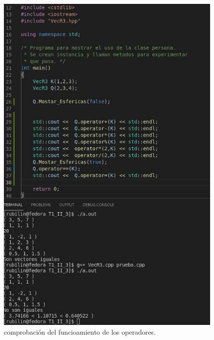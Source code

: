 \documentclass[11pt]{article}
\begin{document}
\begin{figure}[H]
	\centering
	\includegraphics[width=0.4\linewidth]{img9}
	\caption{comprobación del funcioamiento de los operadores. }
\end{figure}






	
	
	
	\vspace{0.1 in}
	
\end{document}

